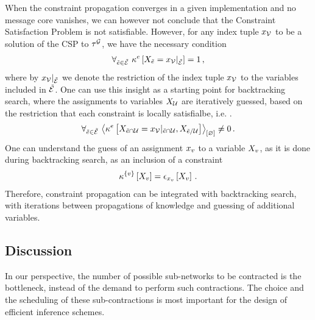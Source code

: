 When the constraint propagation  converges in a given implementation and no message core vanishes, we can however not conclude that the Constraint Satisfaction Problem is not satisfiable.
However, for any index tuple $x_{\mathcal{V}}$ to be a solution of the CSP to $\tau^{\mathcal{G}}$, we have the necessary condition
\begin{align*}
    \forall_{\tilde{e}\in\tilde{\mathcal{E}}} \,\, {\kappa^{e}\left[X_{\tilde{e}}={x_{\mathcal{V}}}|_{\tilde{\mathcal{E}}}\right]=1} \, ,
\end{align*}
where by ${x_{\mathcal{V}}}|_{\tilde{\mathcal{E}}}$ we denote the restriction of the index tuple $x_{\mathcal{V}}$ to the variables included in $\tilde{\mathcal{E}}$.
One can use this insight as a starting point for backtracking search, where the assignments to variables $X_{\mathcal{U}}$ are iteratively guessed, based on the restriction that each constraint is locally satisfialbe, i.e. .
\begin{align*}
    \forall_{\tilde{e}\in\tilde{\mathcal{E}}} \,\, {
        \left\langle \kappa^{e}\left[
            X_{\tilde{e}\cap\mathcal{U}}={x_{\mathcal{V}}}|_{\tilde{e}\cap\mathcal{U}}
            ,X_{\tilde{e}/\mathcal{U}}\right]\right\rangle_{\left[ \varnothing \right]} \neq 0
    } \, .
\end{align*}
One can understand the guess of an assignment $x_{v}$ to a variable $X_{v}$, as it is done during backtracking search, as an inclusion of a constraint
\begin{align*}
    \kappa^{\{v\}}\left[X_{v}\right]
    = \epsilon_{x_{v}}\left[X_{v}\right] \, .
\end{align*}
Therefore, constraint propagation  can be integrated with backtracking search, with iterations between propagations of knowledge and guessing of additional variables.

\subsection{Discussion}

In our perspective, the number of possible sub-networks to be contracted is the bottleneck, instead of the demand to perform such contractions.
The choice and the scheduling of these sub-contractions is most important for the design of efficient inference schemes.
